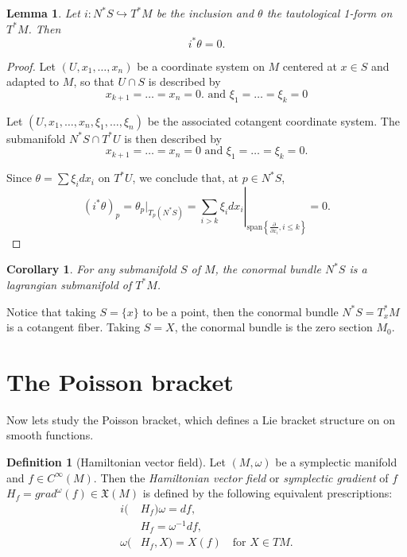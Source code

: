 \documentclass{article}
\numberwithin{theorem}{section}
\newtheorem{lemma}[theorem]{Lemma} %
\newtheorem{corollary}[theorem]{Corollary}
\theoremstyle{definition}
\newtheorem{definition}[theorem]{Definition}
\begin{document}
\begin{lemma}
    Let $i: N^*S \hookrightarrow T^*M$ be the inclusion and $\theta$ the tautological 1-form on $T^*M$. Then
    \begin{equation*}
        i^*\theta = 0.
    \end{equation*}
\end{lemma}

\begin{proof}
    Let $(U, x_1, \ldots, x_n)$ be a coordinate system on $M$ centered at $x \in S$ and adapted to $M$, so that $U \cap S$ is described by 
    \begin{equation*}
        x_{k+1} = \ldots = x_n = 0. \text{ and } \xi_1 = \ldots = \xi_k = 0
    \end{equation*}

    Let $(U, x_1, \ldots, x_n, \xi_1, \ldots, \xi_n)$ be the associated cotangent coordinate system. The submanifold $N^*S \cap T^*U$ is then described by
    \begin{equation}
        x_{k+1} = \ldots = x_n = 0 \text{ and } \xi_1 = \ldots = \xi_k = 0.
    \end{equation}

    Since $\theta = \sum \xi_i dx_i$ on $T^*U$, we conclude that, at $p \in N^*S$,
    \begin{equation}
        (i^* \theta)_p = \theta_p|_{T_p(N^*S)} = \left. \sum_{i > k} \xi_i dx_i \right|_{\mathrm{span}\left\{\frac{\partial}{\partial x_i}, i \leq k \right\}} = 0.
    \end{equation}
\end{proof}

\begin{corollary}
    For any submanifold $S$ of $M$, the conormal bundle $N^*S$ is a lagrangian submanifold of $T^*M$.
\end{corollary}

Notice that taking $S = \{x\}$ to be a point, then the conormal bundle $N^*S = T^*_xM$ is a cotangent fiber. Taking $S = X$, the conormal bundle is the zero section $M_0$.

\section{The Poisson bracket}
Now lets study the Poisson bracket, which defines a Lie bracket structure on on smooth functions.   

\begin{definition}[Hamiltonian vector field]
    Let $(M,\omega)$ be a symplectic manifold and $f \in C^\infty(M)$. Then the \textit{Hamiltonian vector field} or \textit{symplectic gradient} of $f$ $H_f = grad^\omega(f) \in \mathfrak{X}(M)$ is defined by the following equivalent prescriptions:
    \begin{equation*}
        \begin{split}
            i(&H_f)\omega = df,\\
            \quad &H_f = \omega^{-1} df, \\
            \omega(&H_f, X) = X(f) \quad \text{for } X \in TM.  
        \end{split}
    \end{equation*}
\end{definition}
\end{document}
